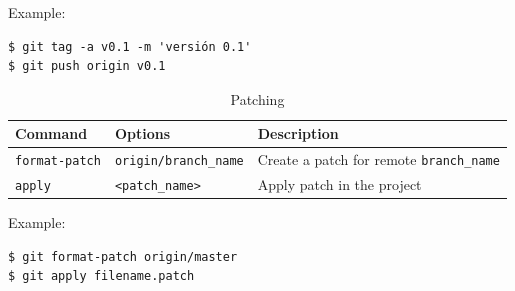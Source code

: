\documentclass[a4paper,10pt]{article}
\newenvironment{terminal}
  {
    \vspace{+10pt}
    \begin{center}
    \begin{minipage}{0.95\textwidth}
    \begin{framed}
  }
  {
    \end{framed}
    \end{minipage}
    \end{center}
    \vspace{+10pt}
  }
\begin{document}
Example:

\begin{terminal}
\begin{verbatim}
$ git tag -a v0.1 -m 'versión 0.1'
$ git push origin v0.1
\end{verbatim}%
\end{terminal}

\begin{table}[h]
\caption{Patching}
\centering
\begin{tabular}{l l l}
\hline\hline
Command & Options & Description \\
\hline\hline
\multirow{1}{*}{\texttt{format-patch}} & \texttt{origin/branch\_name} & Create a patch for remote \texttt{branch\_name} \\ \hline
\multirow{1}{*}{\texttt{apply}} & \texttt{<patch\_name>} & Apply patch in the project \\ \hline
\end{tabular}
\end{table}

Example:

\begin{terminal}
\begin{verbatim}
$ git format-patch origin/master
$ git apply filename.patch
\end{verbatim}%
\end{terminal}
\end{document}
